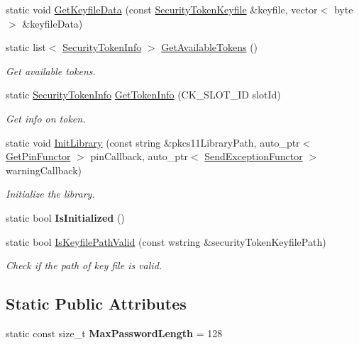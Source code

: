 \begin{DoxyCompactItemize}
static void \hyperlink{class_gost_crypt_1_1_security_token_adca032375ce7732c88a38e03560f5c4e}{Get\+Keyfile\+Data} (const \hyperlink{struct_gost_crypt_1_1_security_token_keyfile}{Security\+Token\+Keyfile} \&keyfile, vector$<$ byte $>$ \&keyfile\+Data)
\item 
static list$<$ \hyperlink{struct_gost_crypt_1_1_security_token_info}{Security\+Token\+Info} $>$ \hyperlink{class_gost_crypt_1_1_security_token_adf8eafa80d4547093a22100ccf1beb00}{Get\+Available\+Tokens} ()
\begin{DoxyCompactList}\small\item\em Get available tokens. \end{DoxyCompactList}\item 
static \hyperlink{struct_gost_crypt_1_1_security_token_info}{Security\+Token\+Info} \hyperlink{class_gost_crypt_1_1_security_token_a61ed08d98ce1809e0a4e917ee4b07563}{Get\+Token\+Info} (C\+K\+\_\+\+S\+L\+O\+T\+\_\+\+ID slot\+Id)
\begin{DoxyCompactList}\small\item\em Get info on token. \end{DoxyCompactList}\item 
static void \hyperlink{class_gost_crypt_1_1_security_token_a49a6110830e19cf95cecdf554a6ca449}{Init\+Library} (const string \&pkcs11\+Library\+Path, auto\+\_\+ptr$<$ \hyperlink{struct_gost_crypt_1_1_get_pin_functor}{Get\+Pin\+Functor} $>$ pin\+Callback, auto\+\_\+ptr$<$ \hyperlink{struct_gost_crypt_1_1_send_exception_functor}{Send\+Exception\+Functor} $>$ warning\+Callback)
\begin{DoxyCompactList}\small\item\em Initialize the library. \end{DoxyCompactList}\item 
\mbox{\label{class_gost_crypt_1_1_security_token_a3479573efcc79847e207e4079b487f5c}} 
static bool {\bfseries Is\+Initialized} ()
\item 
static bool \hyperlink{class_gost_crypt_1_1_security_token_aeb380c24c37eeafb7a7550008b5d131c}{Is\+Keyfile\+Path\+Valid} (const wstring \&security\+Token\+Keyfile\+Path)
\begin{DoxyCompactList}\small\item\em Check if the path of key file is valid. \end{DoxyCompactList}\end{DoxyCompactItemize}
\subsection*{Static Public Attributes}
\begin{DoxyCompactItemize}
\item 
\mbox{\label{class_gost_crypt_1_1_security_token_ad5643217909f2309fdc05efb54f5d16b}} 
static const size\+\_\+t {\bfseries Max\+Password\+Length} = 128
\end{DoxyCompactItemize}
